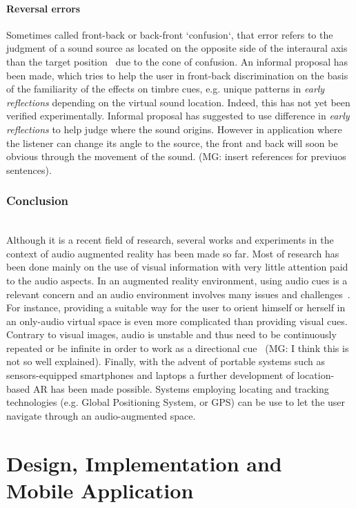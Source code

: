 \documentclass[journal]{IEEEtran}
\begin{document}
\paragraph{Reversal errors}
Sometimes called front-back or back-front `confusion`, that error refers to the judgment of a sound source as located on the opposite side of the interaural axis than the target position~\cite{} due to the cone of confusion. An informal proposal has been made, which tries to help the user in front-back discrimination on the basis of the familiarity of the effects on timbre cues, e.g. unique patterns in \emph{early reflections} depending on the virtual sound location. Indeed, this has not yet been verified experimentally. Informal proposal has suggested to use difference in \emph{early reflections} to help judge where the sound origins. However in application where the listener can change its angle to the source, the front and back will soon be obvious through the movement of the sound. (MG: insert references for previuos sentences).\\

\subsubsection*{Conclusion}~\\
Although it is a recent field of research, several works and experiments in the context of audio augmented reality has been made so far. Most of research has been done mainly on the use of visual information with very little attention paid to the audio aspects. In an augmented reality environment, using audio cues is a relevant concern and an audio environment involves many issues and challenges~\cite{}. For instance, providing a suitable way for the user to orient himself or herself in an only-audio virtual space is even more complicated than providing visual cues. Contrary to visual images, audio is unstable and thus need to be continuously repeated or be infinite in order to work as a directional cue~\cite{} (MG: I think this is not so well explained).   
Finally, with the advent of portable systems such as sensors-equipped smartphones and laptops a further development of location-based AR has been made possible. Systems employing locating and tracking technologies (e.g. Global Positioning System, or GPS) can be use to let the user navigate through an audio-augmented space. 
	
\section{Design, Implementation and Mobile Application}
\end{document}
